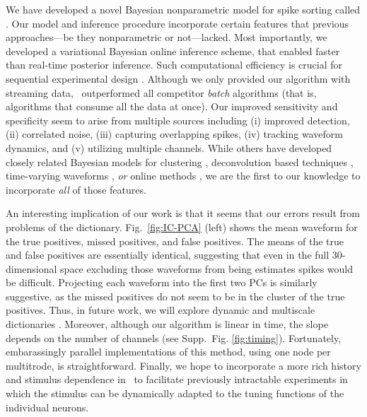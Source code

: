 
We have developed a novel Bayesian nonparametric model for spike sorting called \smug.  Our model and inference procedure incorporate certain features that previous approaches---be they nonparametric or not---lacked.  Most importantly, we developed a variational Bayesian online inference scheme, that enabled faster than real-time posterior inference.  Such computational efficiency is crucial for sequential experimental design \cite{}.  Although we only provided our algorithm with streaming data, \smug\ outperformed all competitor \emph{batch} algorithms (that is, algorithms that consume all the data at once). Our improved sensitivity and specificity seem to arise from multiple sources including (i) improved detection, (ii) correlated noise, (iii) capturing overlapping spikes, (iv) tracking waveform dynamics, and (v) utilizing multiple channels.  While others have developed closely related Bayesian models for clustering \cite{WoodBla2008,wood2009}, deconvolution based techniques \cite{Pillow2013}, time-varying waveforms \cite{calabrese2011kalman},  \emph{or} online methods \cite{OSORT, Franke2010}, we are the first to our knowledge to incorporate \emph{all} of those features.

An interesting implication of our work is that it seems that our errors result from problems of the dictionary.  Fig.\ \ref{fig:IC-PCA} (left) shows the mean waveform for the true positives, missed positives, and false positives.  The means of the true and false positives are essentially identical, suggesting that even in the full 30-dimensional space excluding those waveforms from being estimates spikes would be difficult.  Projecting each waveform into the first two PCs is similarly suggestive, as the missed positives do not seem to be in the cluster of the true positives. Thus, in future work, we will explore dynamic and multiscale dictionaries \cite{Chen}.  Moreover, although our algorithm is linear in time, the slope depends on the number of channels (see Supp.\ Fig. \ref{fig:timing}).  Fortunately, embarassingly parallel implementations of this method, using one node per multitrode, is straightforward.  Finally, we hope to incorporate a more rich history and stimulus dependence in \smug\, to facilitate previously intractable experiments in which the stimulus can be dynamically adapted to the tuning functions of the individual neurons. 



